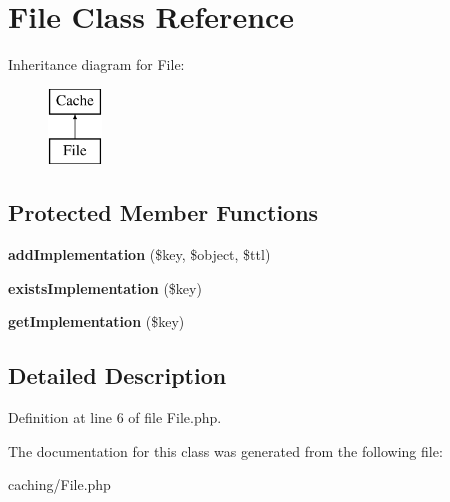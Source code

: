 \hypertarget{class_file}{
\section{File Class Reference}
\label{class_file}
}
Inheritance diagram for File:\begin{figure}[H]
\begin{center}
\leavevmode
\includegraphics[height=2.000000cm]{class_file}
\end{center}
\end{figure}
\subsection*{Protected Member Functions}
\begin{DoxyCompactItemize}
\item 
\hypertarget{class_file_aeadc475944dca57928ec15c5a78da964}{
{\bfseries addImplementation} (\$key, \$object, \$ttl)}
\label{class_file_aeadc475944dca57928ec15c5a78da964}

\item 
\hypertarget{class_file_ae75394a5fe6b914f177d1e2f2f846368}{
{\bfseries existsImplementation} (\$key)}
\label{class_file_ae75394a5fe6b914f177d1e2f2f846368}

\item 
\hypertarget{class_file_a0f0ac32ad8726427c244425832968b31}{
{\bfseries getImplementation} (\$key)}
\label{class_file_a0f0ac32ad8726427c244425832968b31}

\end{DoxyCompactItemize}


\subsection{Detailed Description}


Definition at line 6 of file File.php.



The documentation for this class was generated from the following file:\begin{DoxyCompactItemize}
\item 
caching/File.php\end{DoxyCompactItemize}
